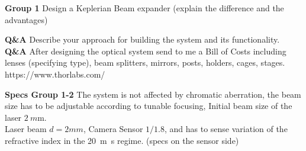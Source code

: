 \documentclass[main.tex]{subfiles}
\begin{document}
\textbf{Group 1} Design a Keplerian Beam expander (explain the difference and the advantages)

\textbf{Q&A} Describe your approach for building the system and its functionality.\\

\textbf{Q&A} After designing the optical system send to me a Bill of Costs including lenses (specifying type), beam splitters, mirrors, posts, holders, cages, stages. https://www.thorlabs.com/

\textbf{Specs Group 1-2} The system is not affected by chromatic aberration, the beam size has to be adjustable according to tunable focusing, Initial beam size of the laser $\SI{2}{m\metre}$.\\

Laser beam $d=2mm$, Camera Sensor $1/1.8$, and has to sense variation of the refractive index in the \SI{20}{m\second} regime. (specs on the sensor side)
\end{document}
